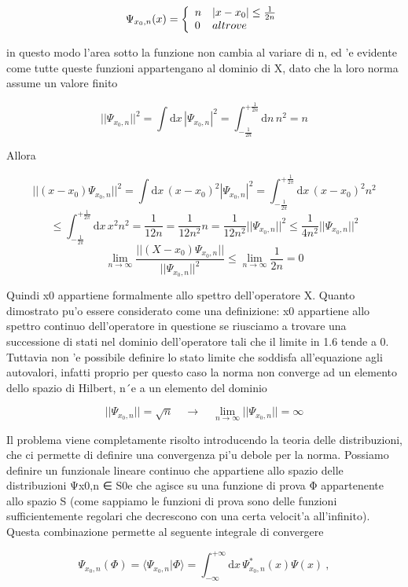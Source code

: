 {	$$\Psi_{x_{0},n}(x)={\left\{\begin{array}{l l}{n}&{|x-x_{0}|\leq{\frac{1}{2n}}}\\ {0}&{a l t r o v e}\end{array}\right.}$$
	
	in questo modo l'area sotto la funzione non cambia al variare di n, ed 'e evidente come tutte queste funzioni appartengano al dominio di X, dato che la loro norma assume un valore finito
	
	$$||\Psi_{x_{0},n}||^{2}=\int\mathrm{d}x\,|\Psi_{x_{0},n}|^{2}=\int_{-\frac{1}{2n}}^{+\frac{1}{2n}}\mathrm{d}n\,n^{2}=n$$
	
	Allora
	
	$$||(x-x_{0})\Psi_{x_{0},n}||^{2}=\int\mathrm{d}x\,(x-x_{0})^{2}|\Psi_{x_{0},n}|^{2}=\int_{-\frac{1}{2\pi}}^{+\frac{1}{2\pi}}\mathrm{d}x\,(x-x_{0})^{2}n^{2}$$ $$\leq\int_{-\frac{1}{2\pi}}^{+\frac{1}{2\pi}}\mathrm{d}x\,x^{2}n^{2}=\frac{1}{12n}=\frac{1}{12n^{2}}n=\frac{1}{12n^{2}}||\Psi_{x_{0},n}||^{2}\leq\frac{1}{4n^{2}}||\Psi_{x_{0},n}||^{2}$$ $$\lim_{n\to\infty}\frac{||(X-x_{0})\Psi_{x_{0},n}||}{||\Psi_{x_{0},n}||^{2}}\leq\lim_{n\to\infty}\frac{1}{2n}=0$$
	
	Quindi x0 appartiene formalmente allo spettro dell'operatore X. Quanto dimostrato pu'o essere considerato come una definizione: x0 appartiene allo spettro continuo dell'operatore in questione se riusciamo a trovare una successione di stati nel dominio dell'operatore tali che il limite in 1.6 tende a 0. Tuttavia non 'e possibile definire lo stato limite che soddisfa all'equazione agli autovalori, infatti proprio per questo caso la norma non converge ad un elemento dello spazio di Hilbert, n´e a un elemento del dominio
	
	$$||\Psi_{x_{0},n}||={\sqrt{n}}\quad\longrightarrow\quad\operatorname*{lim}_{n\longrightarrow\infty}||\Psi_{x_{0},n}||=\infty$$
	
	Il problema viene completamente risolto introducendo la teoria delle distribuzioni, che ci permette di definire una convergenza pi'u debole per la norma. Possiamo definire un funzionale lineare continuo che appartiene allo spazio delle distribuzioni Ψx0,n ∈ S0e che agisce su una funzione di prova Φ appartenente allo spazio S (come sappiamo le funzioni di prova sono delle funzioni sufficientemente regolari che decrescono con una certa velocit'a all'infinito). Questa combinazione permette al seguente integrale di convergere
	
	$$\Psi_{x_{0},n}(\Phi)=\langle\Psi_{x_{0},n}|\Phi\rangle=\int_{-\infty}^{+\infty}\mathrm{d}x\,\Psi_{x_{0},n}^{*}(x)\Psi(x)\ ,$$
	
}
